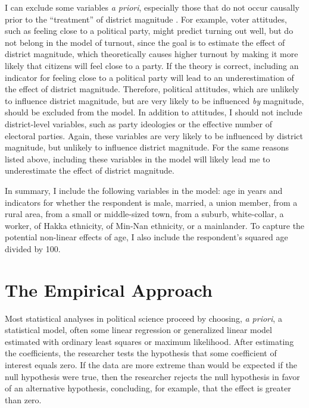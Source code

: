 \documentclass[12pt]{article}
\begin{document}
I can exclude some variables \textit{a priori}, especially those that do not occur causally prior to the ``treatment'' of district magnitude \citep[pp. 188-90]{GelmanHill2007}. For example, voter attitudes, such as feeling close to a political party, might predict turning out well, but do not belong in the model of turnout, since the goal is to estimate the effect of district magnitude, which theoretically causes higher turnout by making it more likely that citizens will feel close to a party. If the theory is correct, including an indicator for feeling close to a political party will lead to an underestimation of the effect of district magnitude. Therefore, political attitudes, which are unlikely to influence district magnitude, but are very likely to be influenced \textit{by} magnitude, should be excluded from the model. In addition to attitudes, I should not include district-level variables, such as party ideologies or the effective number of electoral parties. Again, these variables are very likely to be influenced by district magnitude, but unlikely to influence district magnitude. For the same reasons listed above, including these variables in the model will likely lead me to underestimate the effect of district magnitude. 

In summary, I include the following variables in the model: age in years and indicators for whether the respondent is male, married, a union member, from a rural area, from a small or middle-sized town, from a suburb, white-collar, a worker, of Hakka ethnicity, of Min-Nan ethnicity, or  a mainlander. To capture the potential non-linear effects of age, I also include the respondent's squared age divided by 100.

\section*{The Empirical Approach}

Most statistical analyses in political science proceed by choosing, \textit{a priori}, a statistical model, often some linear regression or generalized linear model estimated with ordinary least squares or maximum likelihood. After estimating the coefficients, the researcher tests the hypothesis that some coefficient of interest equals zero. If the data are more extreme than would be expected if the null hypothesis were true, then the researcher rejects the null hypothesis in favor of an alternative hypothesis, concluding, for example, that the effect is greater than zero.
\end{document}
